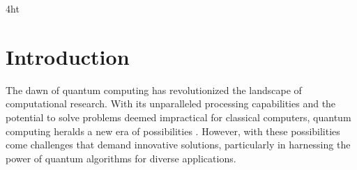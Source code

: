 \documentclass[
  a4paper,  %
  twoside,  %
  bibliography=totoc,
  headsepline,
  cleardoublepage=empty,
  parskip=half,
  draft=false
]{scrbook}
\begin{document}

\printnoidxglossaries

\iftex4ht
\else
\fi



\renewcommand*{\chapterpagestyle}{scrplain}
\pagestyle{scrheadings}
\pagestyle{scrheadings}
\ihead[]{}
\chead[]{}
\ohead[]{\headmark}
\cfoot[]{}
\ifoot[]{}

































%
%

\chapter{Introduction}
\label{chap:introduction}

The dawn of quantum computing has revolutionized the landscape of computational research.
With its unparalleled processing capabilities and the potential to solve problems deemed impractical for classical computers, quantum computing heralds a new era of possibilities \cite{Shor}.
However, with these possibilities come challenges that demand innovative solutions, particularly in harnessing the power of quantum algorithms for diverse applications.
\end{document}
